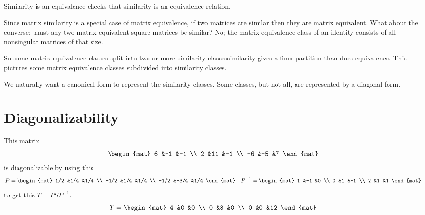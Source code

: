 \documentclass[10pt,t]{beamer}
\begin{document}
\begin{frame}{Similarity is an equivalence}
 checks that
similarity is an equivalence relation.

\pause
Since matrix similarity is a special case of matrix equivalence, 
if two matrices are similar then they are matrix equivalent.
What about the converse:~must any two matrix equivalent square matrices be 
similar?
No; the matrix equivalence class
of an identity consists of all nonsingular matrices of that size. 

\pause
So some matrix equivalence classes
split into two or more similarity classes\Dash similarity gives a finer
partition than does equivalence.
This pictures some matrix equivalence classes subdivided into
similarity classes.

\pause
We naturally want a canonical form to represent the similarity classes.
Some classes, but not all,
are represented by a diagonal form.
\end{frame}




\section{Diagonalizability}
\begin{frame}
\df[df:Diagonalizable]

\ex
This matrix
\begin{equation*}
  \begin{mat}
    6 &-1  &-1 \\
    2 &11  &-1 \\
   -6 &-5  &7
  \end{mat}
\end{equation*}
is diagonalizable by using this
\begin{equation*}
  P=
  \begin{mat}
    1/2 &1/4  &1/4 \\
   -1/2 &1/4  &1/4 \\
   -1/2 &-3/4 &1/4
  \end{mat}
  \quad
  P^{-1}=
  \begin{mat}
    1 &-1 &0 \\
    0 &1 &-1 \\
    2 &1 &1
  \end{mat}
\end{equation*}
to get this $T=PSP^{-1}$.
\begin{equation*}
  T=
  \begin{mat}
    4 &0 &0 \\
    0 &8 &0 \\
    0 &0 &12
  \end{mat}
\end{equation*}
\end{frame}
\begin{frame}
\ex  
{}  
\end{frame}
\end{document}
